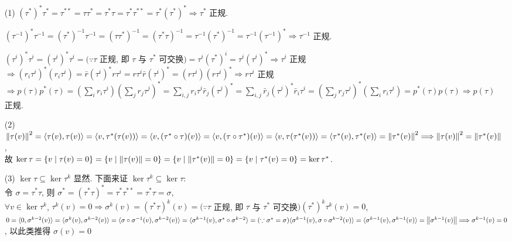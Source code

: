 \documentclass{note}
\begin{document}
\begin{pf}
    \begin{itemize}
        \item[(1)] $(\tau^*)^*\tau^*=\tau^{**}=\tau\tau^*=\tau^*\tau=\tau^*\tau^{**}=\tau^*(\tau^*)^*\Longrightarrow\tau^*$ 正规.

        $(\tau^{-1})^*\tau^{-1}=(\tau^*)^{-1}\tau^{-1}=(\tau\tau^*)^{-1}=(\tau^*\tau)^{-1}=\tau^{-1}(\tau^*)^{-1}=\tau^{-1}(\tau^{-1})^*\Longrightarrow\tau^{-1}$ 正规.

        $(\tau^i)^*\tau^i=(\tau^i)^*\tau^i=(\because\tau$ 正规, 即 $\tau$ 与 $\tau^*$ 可交换$)=\tau^i(\tau^*)^i=\tau^i(\tau^i)^*\Longrightarrow\tau^i$ 正规\\
        $\Longrightarrow(r_i\tau^i)^*(r_i\tau^i)=\bar{r}(\tau^i)^*r\tau^i=r\tau^i\bar{r}(\tau^i)^*=(r\tau^i)(r\tau^i)^*\Longrightarrow r\tau^i$ 正规\\
        $\Longrightarrow p(\tau)p^*(\tau)=\left(\sum_ir_i\tau^i\right)\left(\sum_jr_j\tau^j\right)^*=\sum_{i,j}r_i\tau^i\bar{r}_j(\tau^j)^*=\sum_{i,j}\bar{r}_j(\tau^j)^*\bar{r}_i\tau^i=\left(\sum_jr_j\tau^j\right)^*\left(\sum_ir_i\tau^i\right)=p^*(\tau)p(\tau)\Longrightarrow p(\tau)$ 正规.
        \item[(2)] $\left\lVert\tau(v)\right\rVert^2=\langle\tau(v),\tau(v)\rangle=\langle v,\tau^*(\tau(v))\rangle=\langle v,(\tau^*\circ\tau)(v)\rangle=\langle v,(\tau\circ\tau^*)(v)\rangle=\langle v,\tau(\tau^*(v))\rangle=\langle\tau^*(v),\tau^*(v)\rangle=\left\lVert\tau^*(v)\right\rVert^2\Longrightarrow\left\lVert\tau(v)\right\rVert^2=\left\lVert\tau^*(v)\right\rVert$,\\
        故 $\ker\tau=\{v\mid\tau(v)=0\}=\{v\mid\left\lVert\tau(v)\right\rVert=0\}=\{v\mid\left\lVert\tau^*(v)\right\rVert=0\}=\{v\mid\tau^*(v)=0\}=\ker\tau^*$.
        \item[(3)] $\ker\tau\subseteq\ker\tau^k$ 显然. 下面来证 $\ker\tau^k\subseteq\ker\tau$:\\
        令 $\sigma=\tau^*\tau$, 则 $\sigma^*=(\tau^*\tau)^*=\tau^*\tau^{**}=\tau^*\tau=\sigma$,\\
        $\forall v\in\ker\tau^k$, $\tau^k(v)=0\Longrightarrow\sigma^k(v)=(\tau^*\tau)^k(v)=(\because\tau$ 正规, 即 $\tau$ 与 $\tau^*$ 可交换$)(\tau^*)^k\tau^k(v)=0$,\\
        $0=\langle 0,\sigma^{k-2}(v)\rangle=\langle\sigma^k(v),\sigma^{k-2}(v)\rangle=\langle\sigma\circ\sigma^{-1}(v),\sigma^{k-2}(v)\rangle=\langle\sigma^{k-1}(v),\sigma^*\circ\sigma^{k-2}\rangle=(\because\sigma^*=\sigma)\langle\sigma^{k-1}(v),\sigma\circ\sigma^{k-2}(v)\rangle=\langle\sigma^{k-1}(v),\sigma^{k-1}(v)\rangle=\left\lVert\sigma^{k-1}(v)\right\rVert\Longrightarrow\sigma^{k-1}(v)=0$, 以此类推得 $\sigma(v)=0$\\

\end{itemize}
\end{pf}
\end{document}

